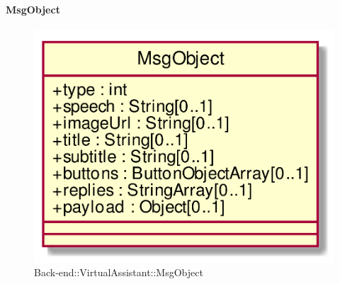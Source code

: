 \FloatBarrier

\hypertarget{MsgObject_label}{\paragraph{MsgObject}}
\begin{figure}[h]
	\centering
	\includegraphics[width=\textwidth,height=\textheight,keepaspectratio]{images/ClassMsgObject.png}
	\caption{Back-end::VirtualAssistant::MsgObject}
\end{figure}
